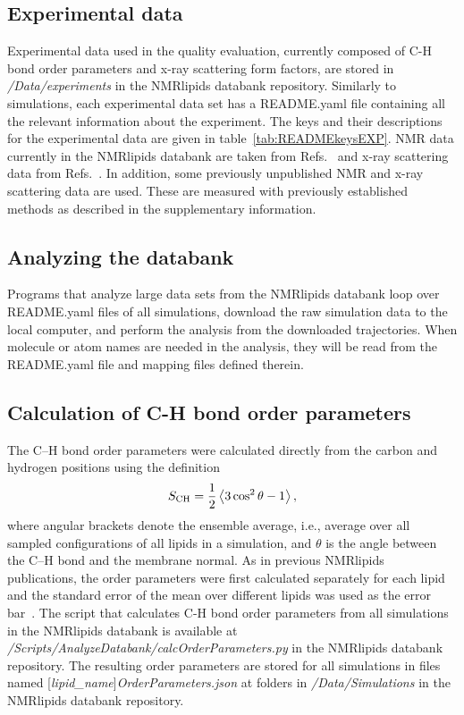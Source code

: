 \documentclass[fleqn,10pt]{wlscirep}
\begin{document}
\subsection{Experimental data}
Experimental data used in the quality evaluation, currently composed of C-H bond order parameters and x-ray scattering form factors, are stored in {\it /Data/experiments} in the NMRlipids databank repository. Similarly to simulations, each experimental data set has a README.yaml file containing all the relevant information about the experiment. The keys and their descriptions for the experimental data are given in table~\ref{tab:READMEkeysEXP}. NMR data currently in the NMRlipids databank are taken from Refs.~ and x-ray scattering data from Refs.~. In addition, some previously unpublished NMR and x-ray scattering data are used. These are measured with previously established methods as described in the supplementary information. 

\subsection{Analyzing the databank}
Programs that analyze large data sets from the NMRlipids databank loop over README.yaml files of all simulations, download the raw simulation data to the local computer, and perform the analysis from the downloaded trajectories. When molecule or atom names are needed in the analysis, they will be read from the README.yaml file and mapping files defined therein.

\subsection{Calculation of C-H bond order parameters}
The C--H bond order parameters were calculated directly from the carbon and hydrogen positions using the definition
\begin{equation}\label{OP}
S_{\rm CH}=\frac{1}{2}\left\langle 3\cos^2\theta -1 \right\rangle,
\end{equation}
where angular brackets denote the ensemble average, i.e., average over all sampled configurations of all lipids in a simulation, and $\theta$ is the angle between the C--H bond and the membrane normal. As in previous NMRlipids publications, the order parameters were first calculated separately for each lipid and the standard error of the mean over different lipids was used as the error bar~\cite{botan15}. The script that calculates C-H bond order parameters from all simulations in the NMRlipids databank is available at {\it /Scripts/AnalyzeDatabank/calcOrderParameters.py} in the NMRlipids databank repository. The resulting order parameters are stored for all simulations in files named %
[{\it lipid\_name}]{\it OrderParameters.json} at folders in {\it /Data/Simulations} in the NMRlipids databank repository.
\end{document}
